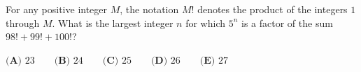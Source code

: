 For any positive integer $M$, the notation $M!$ denotes the product of the integers $1$ through $M$. What is the largest integer $n$ for which $5^n$ is a factor of the sum $98!+99!+100!$?

$\textbf{(A) }23\qquad\textbf{(B) }24\qquad\textbf{(C) }25\qquad\textbf{(D) }26\qquad\textbf{(E) }27$
